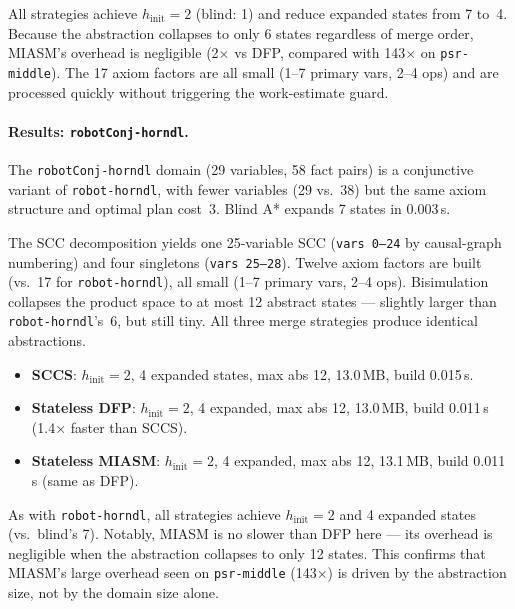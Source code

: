 \documentclass[11pt,a4paper]{article}
\begin{document}
    All strategies achieve $h_{\mathrm{init}} = 2$ (blind: 1) and reduce
    expanded states from 7 to~4.  Because the abstraction collapses to
    only 6 states regardless of merge order, MIASM's overhead is negligible
    (2$\times$ vs DFP, compared with 143$\times$ on \texttt{psr-middle}).
    The 17 axiom factors are all small (1--7 primary vars, 2--4 ops) and
    are processed quickly without triggering the work-estimate guard.

    \paragraph{Results: \texttt{robotConj-horndl}.}

    The \texttt{robotConj-horndl} domain (29 variables, 58 fact pairs) is
    a conjunctive variant of \texttt{robot-horndl}, with fewer variables
    (29 vs.\ 38) but the same axiom structure and optimal plan cost~3.
    Blind A* expands 7 states in 0.003\,s.

    The SCC decomposition yields one 25-variable SCC
    (\texttt{vars 0--24} by causal-graph numbering) and four singletons
    (\texttt{vars 25--28}).  Twelve axiom factors are built (vs.\ 17 for
    \texttt{robot-horndl}), all small (1--7 primary vars, 2--4 ops).
    Bisimulation collapses the product space to at most 12 abstract states
    — slightly larger than \texttt{robot-horndl}'s~6, but still tiny.
    All three merge strategies produce identical abstractions.

    \begin{itemize}
      \item \textbf{SCCS}: $h_{\mathrm{init}} = 2$, 4 expanded states,
            max abs 12, 13.0\,MB, build 0.015\,s.
      \item \textbf{Stateless DFP}: $h_{\mathrm{init}} = 2$, 4 expanded,
            max abs 12, 13.0\,MB, build 0.011\,s (1.4$\times$ faster
            than SCCS).
      \item \textbf{Stateless MIASM}: $h_{\mathrm{init}} = 2$, 4 expanded,
            max abs 12, 13.1\,MB, build 0.011\,s (same as DFP).
    \end{itemize}

    As with \texttt{robot-horndl}, all strategies achieve
    $h_{\mathrm{init}} = 2$ and 4 expanded states (vs.\ blind's 7).
    Notably, MIASM is no slower than DFP here — its overhead is
    negligible when the abstraction collapses to only 12 states.
    This confirms that MIASM's large overhead seen on \texttt{psr-middle}
    (143$\times$) is driven by the abstraction size, not by the domain
    size alone.
\end{document}
